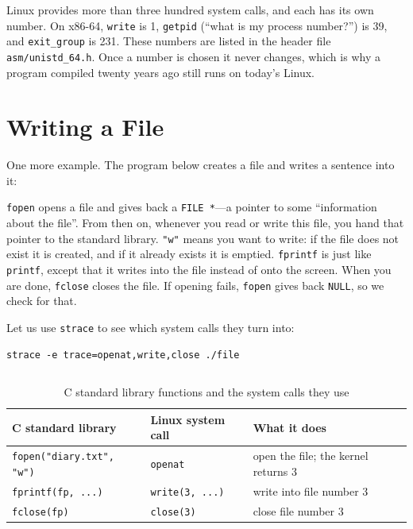 Linux provides more than three hundred system calls, and each has its own number. On x86-64, \texttt{write} is 1, \texttt{getpid} (``what is my process number?'') is 39, and \texttt{exit\_group} is 231. These numbers are listed in the header file \texttt{asm/unistd\_64.h}. Once a number is chosen it never changes, which is why a program compiled twenty years ago still runs on today's Linux.

\section{Writing a File}
\label{sec:file}

One more example. The program below creates a file and writes a sentence into it:


\texttt{fopen} opens a file and gives back a \texttt{FILE *}---a pointer to some ``information about the file''. From then on, whenever you read or write this file, you hand that pointer to the standard library. \texttt{"w"} means you want to write: if the file does not exist it is created, and if it already exists it is emptied. \texttt{fprintf} is just like \texttt{printf}, except that it writes into the file instead of onto the screen. When you are done, \texttt{fclose} closes the file. If opening fails, \texttt{fopen} gives back \texttt{NULL}, so we check for that.

Let us use \texttt{strace} to see which system calls they turn into:
\begin{verbatim}
strace -e trace=openat,write,close ./file
\end{verbatim}
\inputminted[linenos=false]{text}{code/en/ch05/out/strace_file.txt}

\begin{table}[htbp]
  \begin{lazywide}
  \caption{C standard library functions and the system calls they use}
  \label{tab:file-syscalls}
  \begin{tabular}{lll}
    \toprule
    C standard library & Linux system call & What it does \\
    \midrule
    \texttt{fopen("diary.txt", "w")} & \texttt{openat} & open the file; the kernel returns 3 \\
    \texttt{fprintf(fp, ...)}         & \texttt{write(3, ...)} & write into file number 3 \\
    \texttt{fclose(fp)}               & \texttt{close(3)} & close file number 3 \\
    \bottomrule
  \end{tabular}
  \end{lazywide}
\end{table}

